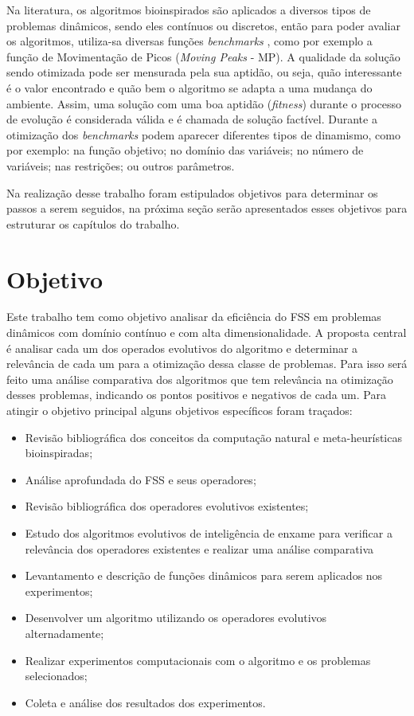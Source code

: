Na literatura, os algoritmos bioinspirados são aplicados a diversos tipos de problemas dinâmicos, sendo eles contínuos ou discretos, então para poder avaliar os algoritmos, utiliza-sa diversas funções \textit{benchmarks} \cite{moser2007review}, como por exemplo a função de Movimentação de Picos (\textit{Moving Peaks} - MP). A qualidade da solução sendo otimizada pode ser mensurada pela sua aptidão, ou seja, quão interessante é o valor encontrado e quão bem o algoritmo se adapta a uma mudança do ambiente. Assim, uma solução com uma boa aptidão (\textit{fitness}) durante o processo de evolução é considerada válida e é chamada de solução factível. Durante a otimização dos \textit{benchmarks} podem aparecer diferentes tipos de dinamismo, como por exemplo: na função objetivo; no domínio das variáveis; no número de variáveis; nas restrições; ou outros parâmetros.

Na realização desse trabalho foram estipulados objetivos para determinar os passos a serem seguidos, na próxima seção serão apresentados esses objetivos para estruturar os capítulos do trabalho.	

\section{Objetivo}
\label{sec:objetivo}
Este trabalho tem como objetivo analisar da eficiência do FSS em problemas dinâmicos com domínio contínuo e com alta dimensionalidade. A proposta central é analisar cada um dos operados evolutivos do algoritmo e determinar a relevância de cada um para a otimização dessa classe de problemas. Para isso será feito uma análise comparativa dos algoritmos que tem relevância na otimização desses problemas, indicando os pontos positivos e negativos de cada um. Para atingir o objetivo principal alguns objetivos específicos foram traçados:

\begin{itemize}
\item Revisão bibliográfica dos conceitos da computação natural e meta-heurísticas bioinspiradas;
\item Análise aprofundada do FSS e seus operadores;
\item Revisão bibliográfica dos operadores evolutivos existentes;
\item Estudo dos algoritmos evolutivos de inteligência de enxame para verificar a relevância dos operadores existentes e realizar uma análise comparativa
\item Levantamento e descrição de funções dinâmicos para serem aplicados nos experimentos;
\item Desenvolver um algoritmo utilizando os operadores evolutivos alternadamente;
\item Realizar experimentos computacionais com o algoritmo e os problemas selecionados;
\item Coleta e análise dos resultados dos experimentos.
\end{itemize} 

